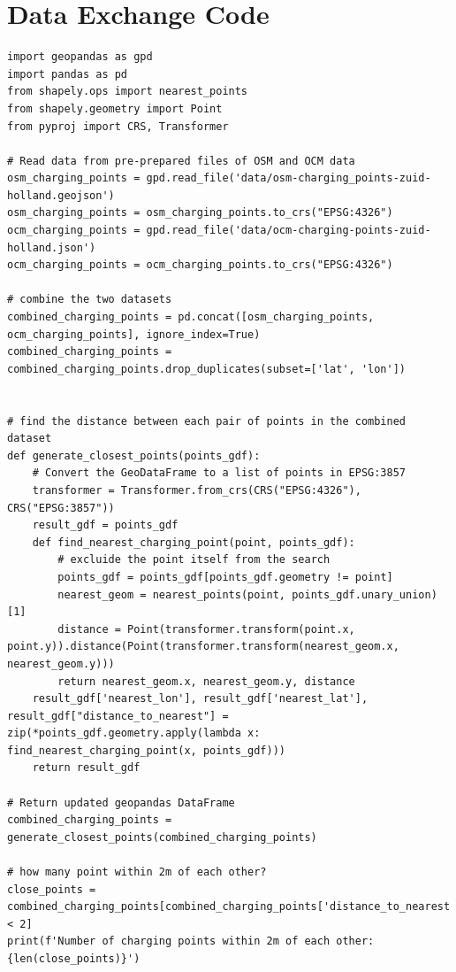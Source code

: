 \documentclass{article}
\begin{document}
\section{Data Exchange Code} \label{appenxdix:data_exchange}
\begin{lstlisting}[style=pythonStyle,caption={Code for data exchange between OSM and OCM}, label={lst:data_exchange}]
import geopandas as gpd
import pandas as pd
from shapely.ops import nearest_points
from shapely.geometry import Point
from pyproj import CRS, Transformer

# Read data from pre-prepared files of OSM and OCM data
osm_charging_points = gpd.read_file('data/osm-charging_points-zuid-holland.geojson')
osm_charging_points = osm_charging_points.to_crs("EPSG:4326")
ocm_charging_points = gpd.read_file('data/ocm-charging-points-zuid-holland.json')
ocm_charging_points = ocm_charging_points.to_crs("EPSG:4326")

# combine the two datasets
combined_charging_points = pd.concat([osm_charging_points, ocm_charging_points], ignore_index=True)
combined_charging_points = combined_charging_points.drop_duplicates(subset=['lat', 'lon'])


# find the distance between each pair of points in the combined dataset
def generate_closest_points(points_gdf):
    # Convert the GeoDataFrame to a list of points in EPSG:3857
    transformer = Transformer.from_crs(CRS("EPSG:4326"), CRS("EPSG:3857"))
    result_gdf = points_gdf
    def find_nearest_charging_point(point, points_gdf):
        # excluide the point itself from the search
        points_gdf = points_gdf[points_gdf.geometry != point]
        nearest_geom = nearest_points(point, points_gdf.unary_union)[1]
        distance = Point(transformer.transform(point.x, point.y)).distance(Point(transformer.transform(nearest_geom.x, nearest_geom.y)))
        return nearest_geom.x, nearest_geom.y, distance
    result_gdf['nearest_lon'], result_gdf['nearest_lat'], result_gdf["distance_to_nearest"] = zip(*points_gdf.geometry.apply(lambda x: find_nearest_charging_point(x, points_gdf)))
    return result_gdf

# Return updated geopandas DataFrame
combined_charging_points = generate_closest_points(combined_charging_points)

# how many point within 2m of each other?
close_points = combined_charging_points[combined_charging_points['distance_to_nearest'] < 2]
print(f'Number of charging points within 2m of each other: {len(close_points)}')


\end{lstlisting}
\end{document}
